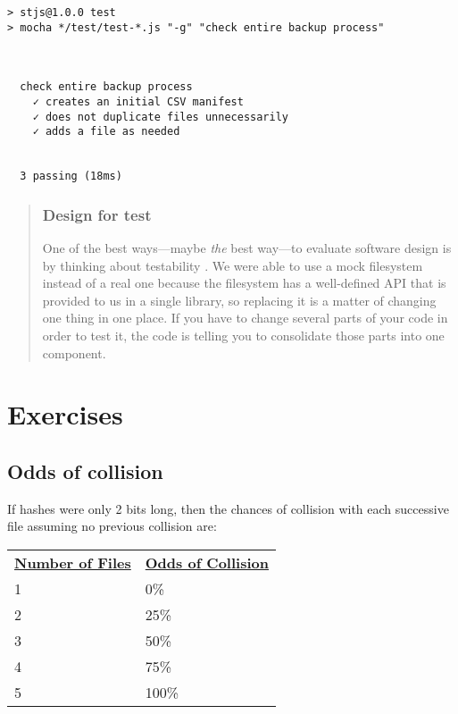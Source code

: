 \documentclass[krantzl]{krantz}
\newenvironment{callout}{\savenotes\begin{tBox}\begin{quotation}\toggletrue{inbox}\renewcommand{\thempfootnote}{\arabic{footnote}}}{\end{quotation}\vspace{\baselineskip}\end{tBox}\togglefalse{inbox}\spewnotes}
\begin{document}
\begin{lstlisting}[frame=tblr,backgroundcolor=\color{black!5}]
> stjs@1.0.0 test
> mocha */test/test-*.js "-g" "check entire backup process"



  check entire backup process
    ✓ creates an initial CSV manifest
    ✓ does not duplicate files unnecessarily
    ✓ adds a file as needed


  3 passing (18ms)
\end{lstlisting}


\begin{callout}


\subsubsection*{Design for test}


One of the best ways—maybe \emph{the} best way—to evaluate software design
is by thinking about testability \cite{Feathers2004}.
We were able to use a mock filesystem instead of a real one
because the filesystem has a well-defined API
that is provided to us in a single library,
so replacing it is a matter of changing one thing in one place.
If you have to change several parts of your code in order to test it,
the code is telling you to consolidate those parts into one component.

\end{callout}

\section{Exercises}\label{file-backup-exercises}

\subsection*{Odds of collision}


If hashes were only 2 bits long,
then the chances of collision with each successive file
assuming no previous collision are:


\vspace{\baselineskip}
\begin{tabular}{ll}
\textbf{\underline{Number of Files}} & \textbf{\underline{Odds of Collision}} \\
1 & 0\% \\
2 & 25\% \\
3 & 50\% \\
4 & 75\% \\
5 & 100\% \\
\end{tabular}
\end{document}
